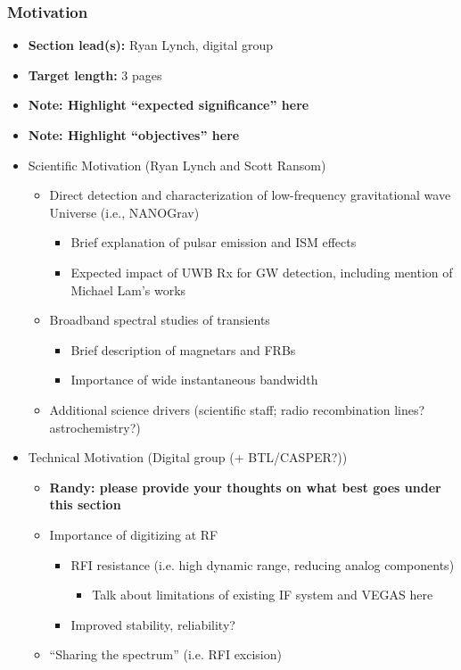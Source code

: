 \documentclass[10pt]{NSF}
\begin{document}
\subsubsection{Motivation}
\label{sec:motivation}

\begin{itemize}
\item{\textbf{Section lead(s):} Ryan Lynch, digital group}
\item{\textbf{Target length:} 3 pages}
\item{\textbf{Note: Highlight ``expected significance'' here}}
\item{\textbf{Note: Highlight ``objectives'' here}}
\item{Scientific Motivation (Ryan Lynch and Scott Ransom)}
  \begin{itemize}
  \item{Direct detection and characterization of low-frequency
      gravitational wave Universe (i.e., NANOGrav)}
    \begin{itemize}
    \item{Brief explanation of pulsar emission and ISM effects}
    \item{Expected impact of UWB Rx for GW detection, including
        mention of Michael Lam's works}
    \end{itemize}
  \item{Broadband spectral studies of transients}
    \begin{itemize}
    \item{Brief description of magnetars and FRBs}
    \item{Importance of wide instantaneous bandwidth}
    \end{itemize}
  \item{Additional science drivers (scientific staff; radio
      recombination lines?  astrochemistry?)}
  \end{itemize}
\item{Technical Motivation (Digital group (+ BTL/CASPER?))}
  \begin{itemize}
  \item{\textbf{Randy: please provide your thoughts on what best goes
        under this section}}
  \item{Importance of digitizing at RF}
    \begin{itemize}
    \item{RFI resistance (i.e. high dynamic range, reducing analog
        components)}
      \begin{itemize}
      \item{Talk about limitations of existing IF system and VEGAS here}
      \end{itemize}
    \item{Improved stability, reliability?}
    \end{itemize}
  \item{``Sharing the spectrum'' (i.e. RFI excision)}
  \end{itemize}
\end{itemize}
\end{document}
